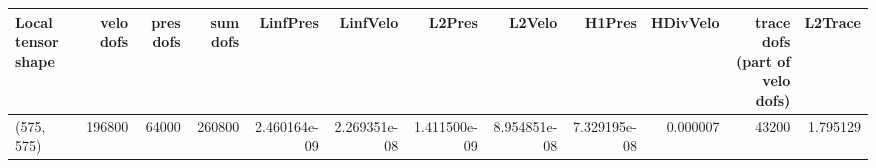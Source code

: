 \begin{tabular}{lrrrrrrrrrrr}
\toprule
Local tensor shape &  velo dofs &  pres dofs &  sum dofs &     LinfPres &     LinfVelo &       L2Pres &       L2Velo &       H1Pres &  HDivVelo &  trace dofs (part of velo dofs) &  L2Trace \\
\midrule
        (575, 575) &     196800 &      64000 &    260800 & 2.460164e-09 & 2.269351e-08 & 1.411500e-09 & 8.954851e-08 & 7.329195e-08 &  0.000007 &                           43200 & 1.795129 \\
\bottomrule
\end{tabular}
